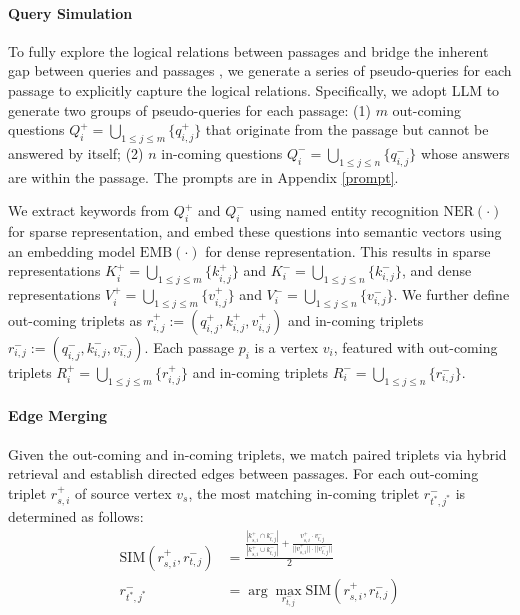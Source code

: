 \paragraph{Query Simulation}
To fully explore the logical relations between passages and bridge the inherent gap between queries and passages \citep{wang_qaencoder_2024}, we generate a series of pseudo-queries for each passage to explicitly capture the logical relations. Specifically, we adopt LLM to generate two groups of pseudo-queries for each passage: (1) $m$ out-coming questions $Q_i^+= \bigcup_{1 \le j \le m} \{q_{i,j}^{+} \}$ that originate from the passage but cannot be answered by itself; (2) $n$ in-coming questions $Q_i^-= \bigcup_{1 \le j \le n} \{q_{i,j}^{-}\}$ whose answers are within the passage. The prompts are in Appendix \ref{prompt}. 

We extract keywords from $Q_i^+$ and $Q_i^-$ using named entity recognition $\text{NER}(\cdot)$ for sparse representation, and embed these questions into semantic vectors using an embedding model $\text{EMB}(\cdot)$ for dense representation. This results in sparse representations $K_i^+= \bigcup_{1 \le j \le m}\{k_{i,j}^{+} \}$ and $K_i^-= \bigcup_{1 \le j \le n}\{k_{i,j}^{-}\}$, and dense representations $V_i^+=\bigcup_{1 \le j \le m} \{v_{i,j}^{+}\}$ and $V_i^-=\bigcup_{1 \le j \le n} \{v_{i,j}^{-}\}$. We further define out-coming triplets as $r_{i,j}^+:=(q_{i,j}^{+},k_{i,j}^{+},v_{i,j}^{+})$ and in-coming triplets $r_{i,j}^-:=(q_{i,j}^{-},k_{i,j}^{-},v_{i,j}^{-})$. Each passage $p_i$ is a vertex $v_i$, featured with out-coming triplets $R_i^+= \bigcup_{1 \le j \le m} \{r_{i,j}^{+}\}$ and in-coming triplets $R_i^-= \bigcup_{1 \le j \le n} \{r_{i,j}^{-} \}$. 

\paragraph{Edge Merging}
Given the out-coming and in-coming triplets, we match paired triplets via hybrid retrieval and establish directed edges between passages.
For each out-coming triplet $r_{s,i}^+$ of source vertex $v_s$, the most matching in-coming triplet $r_{t^*,j^*}^-$ is determined as follows:
\begin{equation}
\label{sim}
\begin{aligned}
    \text{SIM}(r_{s,i}^{+}, r_{t,j}^{-}) &= \frac{\frac{|k_{s,i}^{+} \cap k_{t,j}^{-}|}{|k_{s,i}^{+} \cup k_{t,j}^{-}|}+\frac{v_{s,i}^{+} \cdot v_{t,j}^{-}}{||v_{s,i}^{+}|| \cdot ||v_{t,j}^{-}||}}{2} \\
    r_{t^*,j^*}^- &= \arg\max_{r_{t,j}^{-}  } \text{SIM}(r_{s,i}^{+}, r_{t,j}^{-})
\end{aligned}
\end{equation}

